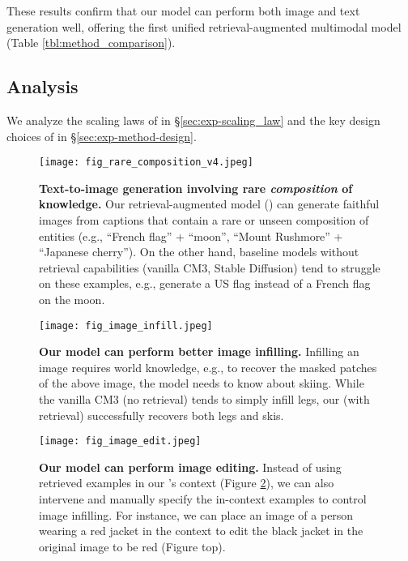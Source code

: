 These results confirm that our model can perform both image and text generation well, offering the first unified retrieval-augmented multimodal model (Table \ref{tbl:method_comparison}).




\subsection{Analysis}
We analyze the scaling laws of \methodname in \S \ref{sec:exp-scaling_law} and the key design choices of \methodname in \S \ref{sec:exp-method-design}.


\begin{figure}[!t]
\hspace{-3mm}
    \texttt{[image: fig\_rare\_composition\_v4.jpeg]}\vspace{-1mm}
    \caption{\textbf{Text-to-image generation involving rare \textit{composition} of knowledge.}
    Our retrieval-augmented model (\methodname) can generate faithful images from captions that contain a rare or unseen composition of entities (e.g., ``French flag'' + ``moon'', ``Mount Rushmore'' + ``Japanese cherry'').
    On the other hand, baseline models without retrieval capabilities (vanilla CM3, Stable Diffusion) tend to struggle on these examples, e.g., generate a US flag instead of a French flag on the moon.
    }\vspace{-1mm}
    \label{fig:rare_composition}
\end{figure}

\begin{figure}[!t]
    \centering
    \texttt{[image: fig\_image\_infill.jpeg]}
    \vspace{-2mm}
    \caption{\textbf{Our model can perform better image infilling.}
    Infilling an image requires world knowledge, e.g., to recover the masked patches of the above image, the model needs to know about skiing. While the vanilla CM3 (no retrieval) tends to simply infill legs, our \methodname (with retrieval) successfully recovers both legs and skis. 
    }\vspace{-1mm}
    \label{fig:image_infill}
\end{figure}

\begin{figure}[!t]
    \centering
    \texttt{[image: fig\_image\_edit.jpeg]}
    \vspace{-2mm}
    \caption{\textbf{Our model can perform image editing.} 
    Instead of using retrieved examples in our \methodname's context (Figure \ref{fig:image_infill}), we can also intervene and manually specify the in-context examples to control image infilling. For instance, we can place an image of a person wearing a red jacket in the context to edit the black jacket in the original image to be red (Figure top). 
    }
    \vspace{1mm}
    \label{fig:image_edit}
\end{figure}

